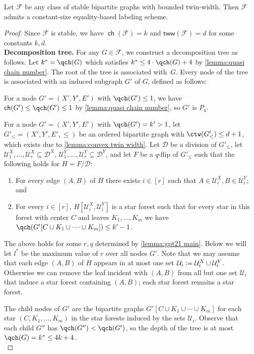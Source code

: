 \documentclass{article}
\newcommand{\define}{\vcentcolon=}
\newcommand{\cD}{\ensuremath{\mathcal{D}}}
\newcommand{\cF}{\ensuremath{\mathcal{F}}}
\newcommand{\cU}{\ensuremath{\mathcal{U}}}
\newcommand{\tw}{\mathsf{tww}}
\DeclareMathOperator\ch{\mathsf{ch}}
\begin{document}
\begin{lemma}
\label{lemma:tw bipartite}
Let $\cF$ be any class of stable bipartite graphs with bounded twin-width. Then $\cF$ admits a
constant-size equality-based labeling scheme.
\end{lemma}
\begin{proof}
Since $\cF$ is stable, we have $\ch(\cF) = k$ and $\tw(\cF)=d$ for some constants $k,d$.\\

\noindent\textbf{Decomposition tree.}
For any $G \in \cF$, we construct a decomposition tree as follows. Let $k^* = \qch(G)$ which
satisfies $k^* \leq 4 \cdot \qch(G) + 4$ by \cref{lemma:quasi chain number}. The root of the tree is
associated with~$G$. Every node of the tree is associated with an induced subgraph $G'$ of $G$,
defined as follows:

For a node $G' = (X',Y',E')$ with $\qch(G') \leq 1$, we have $\ch(G') \leq \qch(G') \leq 1$ by
\cref{lemma:quasi chain number}, so $G'$ is $P_4$.

For a node $G' = (X',Y',E')$ with $\qch(G') = k' > 1$, let $G'_{\leq} = (X',Y',E',\leq)$ be an
ordered bipartite graph with $\ctw(G'_\leq) \leq d+1$, which exists due to \cref{lemma:convex twin
width}. Let $\cD$ be a division of $G'_\leq$, let $\cU^X_1, \dotsc, \cU^X_r \subseteq \cD^X$, $\cU^Y_1, \dotsc, \cU^Y_r \subseteq \cD^Y$, and let
$F$ be a $q$-flip of $G'_\leq$ such that the following holds for $H = F/\cD$:
\begin{enumerate}
\item For every edge $(A,B)$ of $H$ there exists $i \in [r]$ such that $A\in \cU^X_i, B\in \cU^Y_i$; and
\item For every $i\in[r]$, $H[\cU^X_i,\cU^Y_i]$ is a star forest such that for every star in this forest  with
center $C$ and leaves $K_1, \dotsc, K_m$ we have $\qch(G'[C \cup K_1 \cup \dotsm \cup K_m]) \leq
k'-1$.
\end{enumerate}
The above holds for some $r,q$ determined by \cref{lemma:gpt21 main}. Below we will let $l^*$ be
the maximum value of $r$ over all nodes $G'$.  Note that we may assume that each edge $(A,B)$ of
$H$ appears in at most one set $\cU_i\define \cU^X_i\cup\cU^Y_i$. Otherwise we can remove the leaf incident with $(A,B)$ from all but one set $\cU_i$ that induce a star forest containing $(A,B)$; each star forest remains a star forest.

The child nodes of $G'$ are the bipartite graphs $G'[C \cup K_1 \cup \dotsm \cup K_m]$ for each star
$(C, K_1, \dotsc, K_m)$ in the star forests induced by the sets $\cU_i$. 
Observe that each child $G''$ has $\qch(G'') < \qch(G')$, so the depth of the tree is at most
$\qch(G) = k^* \leq 4k + 4$.\\


\end{proof}
\end{document}
